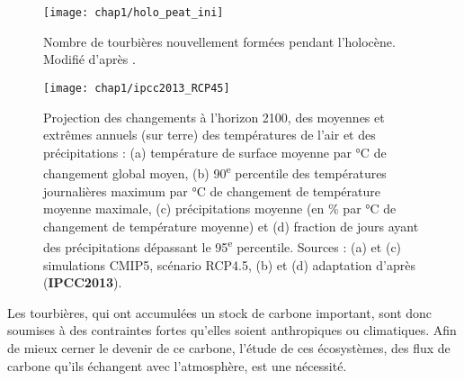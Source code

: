 \begin{figure}
\centering
\texttt{[image: chap1/holo\_peat\_ini]}
\caption{Nombre de tourbières nouvellement formées pendant l'holocène. Modifié d'après \citep{macdonald2006}.}
\label{fig:holo_peat_ini}
\end{figure}


\begin{figure}
\centering
\texttt{[image: chap1/ipcc2013\_RCP45]}
\caption{Projection des changements à l'horizon 2100, des moyennes et extrêmes annuels (sur terre) des températures de l'air et des précipitations : (a) température de surface moyenne par \si{\degreeCelsius} de changement global moyen, (b) 90\textsuperscript{e} percentile des températures journalières maximum par \si{\degreeCelsius} de changement de température moyenne maximale, (c) précipitations moyenne (en \si{\percent} par \si{\degreeCelsius} de changement de température moyenne) et (d) fraction de jours ayant des précipitations dépassant le 95\textsuperscript{e} percentile. Sources : (a) et (c) simulations CMIP5, scénario RCP4.5, (b) et (d) adaptation d'après \citet{orlowsky2012}(\textbf{IPCC2013}).}
\label{fig:ipcc2013_T_rain}
\end{figure}


Les tourbières, qui ont accumulées un stock de carbone important, sont donc soumises à des contraintes fortes qu'elles soient anthropiques ou climatiques.
Afin de mieux cerner le devenir de ce carbone, l'étude de ces écosystèmes, des flux de carbone qu'ils échangent avec l'atmosphère, est une nécessité.

